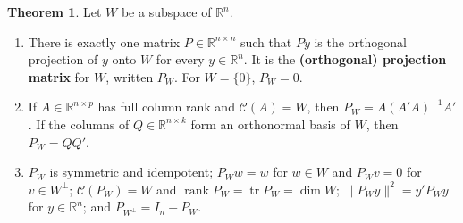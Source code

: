 \documentclass[12pt]{article}
\newcommand{\R}{\mathbb R}
\DeclareMathOperator{\tr}{tr}
\DeclareMathOperator{\rank}{rank}
\theoremstyle{definition}
\newtheorem{theorem}{Theorem}
\begin{document}
\begin{theorem}\label{r6-thm-projection-matrix}
Let \(W\) be a subspace of \(\R^n\).
\begin{enumerate}
\item There is exactly one matrix \(P\in\R^{n\times n}\) such that \(Py\) is the orthogonal projection of \(y\) onto
\(W\) for every \(y\in\R^n\). It is the \textbf{(orthogonal) projection matrix} for \(W\), written \(P_W\). For
\(W=\{0\}\), \(P_W=0\).
\item If \(A\in\R^{n\times p}\) has full column rank and \(\mathcal C(A)=W\), then \(P_W=A(A'A)^{-1}A'\). If the
columns of \(Q\in\R^{n\times k}\) form an orthonormal basis of \(W\), then \(P_W=QQ'\).
\item \(P_W\) is symmetric and idempotent; \(P_Ww=w\) for \(w\in W\) and \(P_Wv=0\) for \(v\in W^\perp\);
\(\mathcal C(P_W)=W\) and \(\rank P_W=\tr P_W=\dim W\); \(\lVert P_Wy\rVert^2=y'P_Wy\) for \(y\in\R^n\); and
\(P_{W^\perp}=I_n-P_W\).
\end{enumerate}
\end{theorem}
\end{document}
